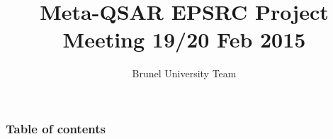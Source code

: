 \documentclass[compress]{beamer}
\title[Meta-QSAR EPSRC Project Meeting 19/20 Feb 2015] %
{Meta-QSAR EPSRC Project Meeting 19/20 Feb 2015}
\author[Brunel University Team] %
{Brunel University Team}
\institute[Brunel University - London] %
{
  Dept of Computer Science\\
  Brunel University 
}
\date[\today] %
\begin{document}
\begin{frame}
\titlepage
\end{frame} 

\begin{frame}
\frametitle{Table of contents}
\tableofcontents
\end{frame}
 

\end{document}
